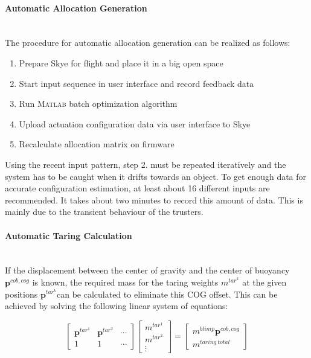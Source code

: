 \paragraph{Automatic Allocation Generation}~\\
The procedure for automatic allocation generation can be realized as follows:
\begin{enumerate}
\item Prepare Skye for flight and place it in a big open space
\item Start input sequence in user interface and record feedback data
\item Run \textsc{Matlab} batch optimization algorithm
\item Upload actuation configuration data via user interface to Skye
\item Recalculate allocation matrix on firmware
\end{enumerate}
Using the recent input pattern, step 2. must be repeated iteratively and the system has to be caught when it drifts towards an object.
To get enough data for accurate configuration estimation, at least about 16 different inputs are recommended.
It takes about two minutes to record this amount of data.
This is mainly due to the transient behaviour of the trusters.
 
\paragraph{Automatic Taring Calculation}~\\
If the displacement between the center of gravity and the center of buoyancy $\mathbf{p}^{cob,cog}$ is known, the required mass for the taring weights $m^{tar^k}$ at the given positions $\mathbf{p}^{tar^k}$can be calculated to eliminate this COG offset.
This can be achieved by solving the following linear system of equations:

\begin{equation}
\left[\begin{array}{ccc}
\mathbf{p}^{tar^1} & \mathbf{p}^{tar^2} & \cdots \\
1 & 1 & \cdots
\end{array} \right]
\left[\begin{array}{c}
m^{tar^1} \\
m^{tar^2} \\
\vdots
\end{array} \right]
=
\left[\begin{array}{c}
m^{blimp} \mathbf{p}^{cob,cog} \\
m^{taring~total}
\end{array} \right]
\end{equation}

